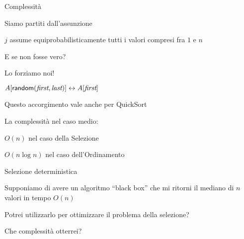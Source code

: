 \begin{frame}{Complessità}
   
\vspace{-9pt}
\BIL
\item  Siamo partiti dall’assunzione 
  \BI
  \item $j$ assume equiprobabilisticamente tutti i valori compresi fra $1$ e $n$
  \EI
\item E se non fosse vero?
\item Lo forziamo noi!
  \BI
  \item  $A[\textsf{random}(\textit{first}, \textit{last})] \leftrightarrow A[\textit{first}]$
  \EI
\item Questo accorgimento vale anche per QuickSort    
\item La complessità nel caso medio:
  \BI
  \item $O(n)$ nel caso della Selezione
  \item $O(n \log n)$ nel caso dell'Ordinamento
  \EI
\EIL

\end{frame}

\begin{frame}{Selezione deterministica}

\vspace{-9pt}
\begin{myboxtitle}
Supponiamo di avere un algoritmo “black box” che mi ritorni il mediano di $n$ valori in tempo $O(n)$
\end{myboxtitle}

\begin{myboxtitle}[Domande]
\BIL
\item Potrei utilizzarlo per ottimizzare il problema della selezione?
\item Che complessità otterrei?
\EIL
\end{myboxtitle}

\end{frame}


